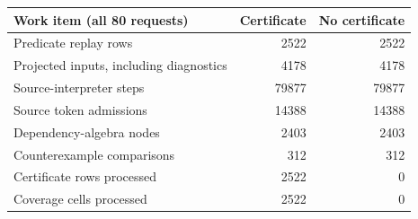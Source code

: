 \begin{tabular}{l r r}
\toprule
Work item (all 80 requests) & Certificate & No certificate \\
\midrule
Predicate replay rows & 2522 & 2522 \\
Projected inputs, including diagnostics & 4178 & 4178 \\
Source-interpreter steps & 79877 & 79877 \\
Source token admissions & 14388 & 14388 \\
Dependency-algebra nodes & 2403 & 2403 \\
Counterexample comparisons & 312 & 312 \\
Certificate rows processed & 2522 & 0 \\
Coverage cells processed & 2522 & 0 \\
\bottomrule
\end{tabular}
